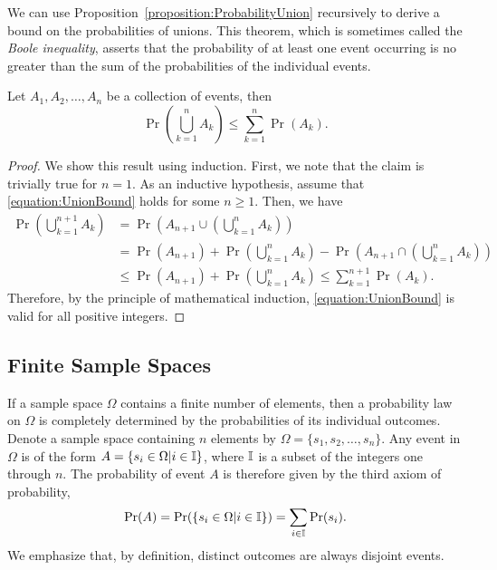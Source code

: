 We can use Proposition~\ref{proposition:ProbabilityUnion} recursively to derive a bound on the probabilities of unions.
This theorem, which is sometimes called the \emph{Boole inequality}, asserts that the probability of at least one event occurring is no greater than the sum of the probabilities of the individual events.

\begin{theorem}
Let $A_1, A_2, \ldots, A_n$ be a collection of events, then
\begin{equation} \label{equation:UnionBound}
\Pr \left( \bigcup_{k=1}^{n} A_k \right)
\leq \sum_{k = 1}^{n} \Pr (A_k) .
\end{equation}
\end{theorem}
\begin{proof}
We show this result using induction.
First, we note that the claim is trivially true for $n = 1$.
As an inductive hypothesis, assume that \eqref{equation:UnionBound} holds for some $n \geq 1$.
Then, we have
\begin{equation*}
\begin{split}
\Pr \left( \bigcup_{k=1}^{n+1} A_k \right)
&= \Pr \left( A_{n+1} \cup \left( \bigcup_{k=1}^{n} A_k \right) \right) \\
&= \Pr (A_{n+1}) + \Pr \left( \bigcup_{k=1}^{n} A_k \right)
- \Pr \left( A_{n+1} \cap \left( \bigcup_{k=1}^{n} A_k \right) \right) \\
&\leq \Pr (A_{n+1}) + \Pr \left( \bigcup_{k=1}^{n} A_k \right)
\leq \sum_{k = 1}^{n+1} \Pr (A_k) .
\end{split}
\end{equation*}
Therefore, by the principle of mathematical induction, \eqref{equation:UnionBound} is valid for all positive integers.
\end{proof}


\subsection{Finite Sample Spaces}
\label{section:FiniteSampleSpaces}

If a sample space $\Omega$ contains a finite number of elements, then a probability law on $\Omega$ is completely determined by the probabilities of its individual outcomes.
Denote a sample space containing $n$ elements by $\Omega = \{ s_1, s_2, \ldots, s_n \}$.
Any event in $\Omega$ is of the form $A = \{ s_i \in \Omega | i \in \mathbb{I} \}$, where $\mathbb{I}$ is a subset of the integers one through $n$.
The probability of event $A$ is therefore given by the third axiom of probability,
\begin{equation*}
\Pr (A)
= \Pr ( \{ s_i \in \Omega | i \in \mathbb{I} \} )
= \sum_{i \in \mathbb{I}} \Pr (s_i) .
\end{equation*}
We emphasize that, by definition, distinct outcomes are always disjoint events.

